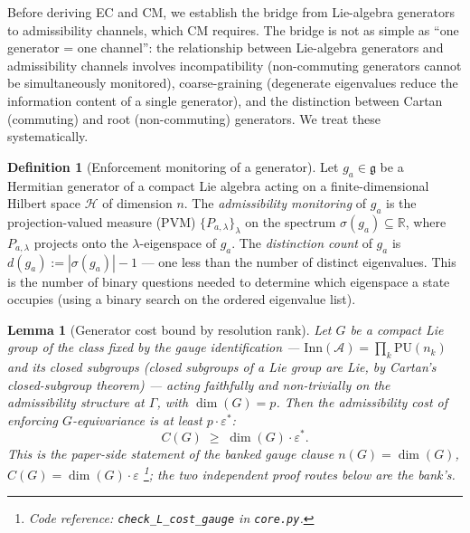 \documentclass[11pt]{article}
\newtheorem{lemma}[theorem]{Lemma}
\theoremstyle{definition}
\newtheorem{definition}[theorem]{Definition}
\newcommand{\coderef}[2]{\footnote{Code reference: \texttt{#1} in \texttt{#2}.}}
\begin{document}
Before deriving EC and CM, we establish the bridge from
Lie-algebra generators to admissibility channels, which CM requires.
The bridge is not as simple as ``one generator = one channel'': the
relationship between Lie-algebra generators and admissibility channels
involves incompatibility (non-commuting generators cannot be
simultaneously monitored), coarse-graining (degenerate eigenvalues
reduce the information content of a single generator), and the
distinction between Cartan (commuting) and root (non-commuting)
generators.  We treat these systematically.

\begin{definition}[Enforcement monitoring of a generator]%
\label{def:monitoring}
Let $g_a \in \mathfrak{g}$ be a Hermitian generator of a compact Lie
algebra acting on a finite-dimensional Hilbert space $\mathcal{H}$ of
dimension $n$.  The \emph{admissibility monitoring} of $g_a$ is the
projection-valued measure (PVM) $\{P_{a,\lambda}\}_\lambda$ on the
spectrum $\sigma(g_a) \subseteq \mathbb{R}$, where $P_{a,\lambda}$
projects onto the $\lambda$-eigenspace of $g_a$.  The \emph{distinction
count} of $g_a$ is $d(g_a) := |\sigma(g_a)| - 1$ --- one less than
the number of distinct eigenvalues.  This is the number of binary
questions needed to determine which eigenspace a state occupies
(using a binary search on the ordered eigenvalue list).
\end{definition}

\begin{lemma}[Generator cost bound by resolution rank]\label{lem:gen_channel}
Let $G$ be a compact Lie group of the class fixed by the gauge
identification --- $\mathrm{Inn}(\mathcal{A}) = \prod_k \mathrm{PU}(n_k)$
and its closed subgroups (closed subgroups of a Lie group are Lie, by
Cartan's closed-subgroup theorem) --- acting faithfully and
non-trivially on the admissibility structure at $\Gamma$, with
$\dim(G) = p$.  Then the admissibility cost of \emph{enforcing}
$G$-equivariance is at least $p \cdot \varepsilon^*$:
\[
  C(G) \;\ge\; \dim(G)\cdot\varepsilon^* .
\]
This is the paper-side statement of the banked gauge clause
$n(G) = \dim(G)$, $C(G) = \dim(G)\cdot\varepsilon$
\coderef{check\_L\_cost\_gauge}{core.py}; the two independent proof
routes below are the bank's.
\end{lemma}
\end{document}
